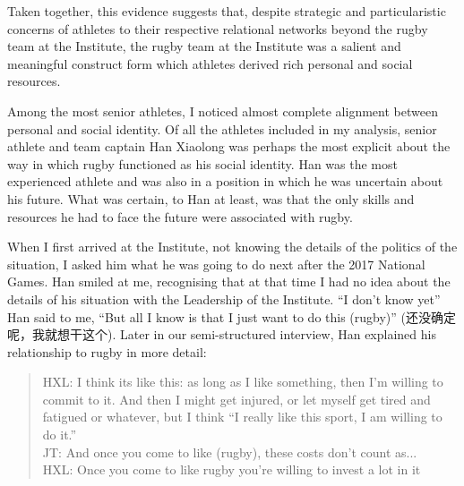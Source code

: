 \begin{CJK}{UTF8}{gbsn}

Taken together, this evidence suggests that, despite strategic and particularistic concerns of athletes to their respective relational networks beyond the rugby team at the Institute, the rugby team at the Institute was a salient and meaningful construct form which athletes derived rich personal and social resources.

Among the most senior athletes, I noticed almost complete alignment between personal and social identity.  Of all the athletes included in my analysis, senior athlete and team captain Han Xiaolong was perhaps the most explicit about the way in which rugby functioned as his social identity.  Han was the most experienced athlete and was also in a position in which he was uncertain about his future. What was certain, to Han at least, was that the only skills and resources he had to face the future were associated with rugby.

When I first arrived at the Institute, not knowing the details of the politics of the situation, I asked him what he was going to do next after the 2017 National Games.  Han smiled at me, recognising that at that time I had no idea about the details of his situation with the Leadership of the Institute. ``I don't know yet'' Han said to me, ``But all I know is that I just want to do this (rugby)'' (还没确定呢，我就想干这个).  Later in our semi-structured interview, Han explained his relationship to rugby in more detail:
          \begin{quote}
            HXL: I think its like this: as long as I like something, then I'm willing to commit to it.  And then I might get injured, or let myself get tired and fatigued or whatever, but I think ``I really like this sport, I am willing to do it.''\\
            JT: And once you come to like (rugby), these costs don't count as...\\
            HXL: Once you come to like rugby you're willing to invest a lot in it
          \end{quote}


\end{CJK}
